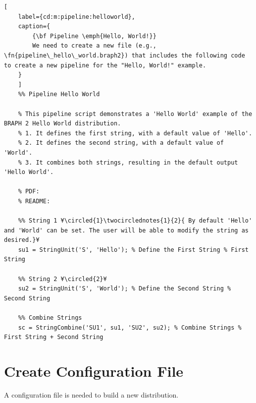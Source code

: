 \documentclass{tufte-handout}
\begin{document}
\begin{lstlisting}[
	label={cd:m:pipeline:helloworld},
	caption={
		{\bf Pipeline \emph{Hello, World!}}
		We need to create a new file (e.g., \fn{pipeline\_hello\_world.braph2}) that includes the following code to create a new pipeline for the "Hello, World!" example.
	}
	]
	%% Pipeline Hello World

	% This pipeline script demonstrates a 'Hello World' example of the BRAPH 2 Hello World distribution.
	% 1. It defines the first string, with a default value of 'Hello'.
	% 2. It defines the second string, with a default value of 'World'.
	% 3. It combines both strings, resulting in the default output 'Hello World'.
	
	% PDF: 
	% README: 
	
	%% String 1 ¥\circled{1}\twocirclednotes{1}{2}{ By default 'Hello' and 'World' can be set. The user will be able to modify the string as desired.}¥
	su1 = StringUnit('S', 'Hello'); % Define the First String % First String
	
	%% String 2 ¥\circled{2}¥
	su2 = StringUnit('S', 'World'); % Define the Second String % Second String
	
	%% Combine Strings
	sc = StringCombine('SU1', su1, 'SU2', su2); % Combine Strings % First String + Second String
\end{lstlisting}

\clearpage
\section{Create Configuration File}

A configuration file is needed to build a new distribution.
\end{document}
